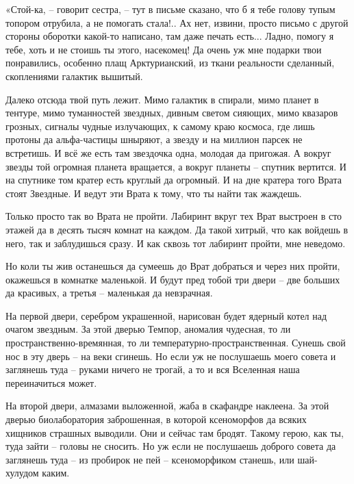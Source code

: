 \documentclass[ebook,oneside,final,openright]{memoir}
\begin{document}
\par
«Стой-ка, – говорит сестра, – тут в письме сказано, что б я тебе голову тупым топором отрубила, а не помогать стала!.. Ах нет, извини, просто письмо с другой стороны оборотки какой-то написано, там даже печать есть... Ладно, помогу я тебе, хоть и не стоишь ты этого, насекомец! Да очень уж мне подарки твои понравились, особенно плащ Арктурианский, из ткани реальности сделанный, скоплениями галактик вышитый.\par
\par
Далеко отсюда твой путь лежит. Мимо галактик в спирали, мимо планет в тентуре, мимо туманностей звездных, дивным светом сияющих, мимо квазаров грозных, сигналы чудные излучающих, к самому краю космоса, где лишь протоны да альфа-частицы шныряют, а звезду и на миллион парсек не встретишь. И всё же есть там звездочка одна, молодая да пригожая. А вокруг звезды той огромная планета вращается, а вокруг планеты – спутник вертится. И на спутнике том кратер есть круглый да огромный. И на дне кратера того Врата стоят Звездные. И ведут эти Врата к тому, что ты найти так жаждешь.\par
\par
Только просто так во Врата не пройти. Лабиринт вкруг тех Врат выстроен в сто этажей да в десять тысяч комнат на каждом. Да такой хитрый, что как войдешь в него, так и заблудишься сразу. И как сквозь тот лабиринт пройти, мне неведомо.\par
\par
Но коли ты жив останешься да сумеешь до Врат добраться и через них пройти, окажешься в комнатке маленькой. И будут пред тобой три двери – две больших да красивых, а третья – маленькая да невзрачная.\par
\par
На первой двери, серебром украшенной, нарисован будет ядерный котел над очагом звездным. За этой дверью Темпор, аномалия чудесная, то ли пространственно-времянная, то ли температурно-пространственная. Сунешь свой нос в эту дверь – на веки сгинешь. Но если уж не послушаешь моего совета и заглянешь туда – руками ничего не трогай, а то и вся Вселенная наша переиначиться может.\par
\par
На второй двери, алмазами выложенной, жаба в скафандре наклеена. За этой дверью биолаборатория заброшенная, в которой ксеноморфов да всяких хищников страшных выводили. Они и сейчас там бродят. Такому герою, как ты, туда зайти – головы не сносить. Но уж если не послушаешь доброго совета да заглянешь туда – из пробирок не пей – ксеноморфиком станешь, или шай-хулудом каким.\par
\end{document}
